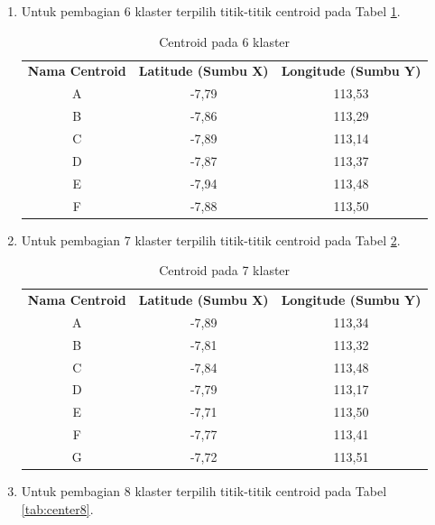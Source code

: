 \begin{enumerate}
\begin{enumerate}
	\item Untuk pembagian 6 klaster terpilih titik-titik centroid pada Tabel \ref{tab:center6}.
	
\begin{table}[H]
\footnotesize
\centering
\begin{tabular}{ccc}
\rowcolor[HTML]{4472C4} 
{\color[HTML]{FFFFFF} \textbf{Nama   Centroid}} & {\color[HTML]{FFFFFF} \textbf{Latitude (Sumbu X)}} & {\color[HTML]{FFFFFF} \textbf{Longitude (Sumbu Y)}} \\
\rowcolor[HTML]{D9E1F2} 
A & -7,79 & 113,53 \\
B & -7,86 & 113,29 \\
\rowcolor[HTML]{D9E1F2} 
C & -7,89 & 113,14 \\
D & -7,87 & 113,37 \\
\rowcolor[HTML]{D9E1F2} 
E & -7,94 & 113,48 \\
F & -7,88 & 113,50
\end{tabular}
\caption{Centroid pada 6 klaster}
\label{tab:center6}
\end{table}

	\item Untuk pembagian 7 klaster terpilih titik-titik centroid pada Tabel \ref{tab:center7}.
	
\begin{table}[H]
\footnotesize
\centering
\begin{tabular}{ccc}
\rowcolor[HTML]{4472C4} 
{\color[HTML]{FFFFFF} \textbf{Nama   Centroid}} & {\color[HTML]{FFFFFF} \textbf{Latitude (Sumbu X)}} & {\color[HTML]{FFFFFF} \textbf{Longitude (Sumbu Y)}} \\
\rowcolor[HTML]{D9E1F2} 
A & -7,89 & 113,34 \\
B & -7,81 & 113,32 \\
\rowcolor[HTML]{D9E1F2} 
C & -7,84 & 113,48 \\
D & -7,79 & 113,17 \\
\rowcolor[HTML]{D9E1F2} 
E & -7,71 & 113,50 \\
F & -7,77 & 113,41 \\
\rowcolor[HTML]{D9E1F2} 
G & -7,72 & 113,51
\end{tabular}
\caption{Centroid pada 7 klaster}
\label{tab:center7}
\end{table}

	\item Untuk pembagian 8 klaster terpilih titik-titik centroid pada Tabel \ref{tab:center8}.
	

\end{enumerate}
\end{enumerate}
